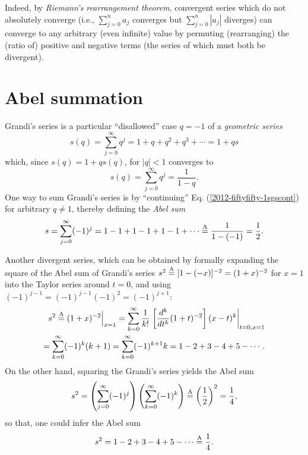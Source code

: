 Indeed, by {\em Riemann's rearrangement theorem},
convergent series  which do not absolutely converge
(i.e., $\sum_{j=0}^n a_j$ converges but $\sum_{j=0}^n \left| a_j \right|$ diverges)
can converge to any arbitrary (even infinite) value
by permuting (rearranging) the (ratio of) positive and negative terms
(the series of which must both be divergent).



\section{Abel summation}

Grandi's series is a particular ``disallowed'' case $q=-1$ of a {\em geometric series}
\begin{equation}
s(q) = \sum_{j=0}^\infty q^j=1+q+q^2+q^3+ \cdots  =1+q s
\label{2009-fiftyfifty-1sgs}
\end{equation}
which, since $s(q)=1+q s(q)$, for $\vert q\vert <1$ converges  to
\begin{equation}
s(q)= \sum_{j=0}^\infty q^j= \frac{1}{1-q}.
\label{2012-fiftyfifty-1sgscont}
\end{equation}
One way to sum Grandi's series is by ``continuing''
Eq. (\ref{2012-fiftyfifty-1sgscont})
for arbitrary $q\neq 1$, thereby defining the
{\em Abel sum}
\begin{equation}
s=\sum_{j=0}^\infty(-1)^j  = 1-1+1-1+1-1+\cdots \stackrel{{\rm A}}{=} \frac{1}{1-(-1)} = \frac{1}{2}.
\label{2012-fiftyfifty-1sgscont1}
\end{equation}


Another divergent series,
which can be obtained by formally  expanding  the square of the Abel sum of
Grandi's series
$
s^2 \stackrel{{\rm A}}{=} [1-(-x)]^{-2} = (1+x)^{-2}
$ for  $x=1$
into the Taylor series\cite{Kline-83}
around $t=0$, and using   $(-1)^{j-1}=(-1)^{j-1}(-1)^{2}=(-1)^{j+1}$:
\begin{equation}
\begin{split}
s^2   \stackrel{{\rm A}}{=} (1+x)^{-2}  \Big|_{x =1}=
\sum_{k=0}^\infty \frac{1}{k!}\left.\left[\frac{d^k}{d{t}^k}  (1+t)^{-2}\right]   (x-t)^k\right|_{t=0, x=1}
\\
=
\sum_{k=0}^\infty (-1)^k (k+1) =
\sum_{k=0}^\infty (-1)^{k+1} k =
1-2+3-4+5-\cdots
.
\label{2009-fiftyfifty-1s1}
\end{split}
\end{equation}
On the other hand, squaring the Grandi's series yields the Abel sum
\begin{equation}
s^2 =
\left(\sum_{j=0}^\infty (-1)^j\right)
\left(\sum_{k=0}^\infty (-1)^k\right)
\stackrel{{\rm A}}{=} \left(\frac{1}{2}\right)^2=\frac{1}{4},
\end{equation}
so that, one could infer the Abel sum
\begin{equation}
s^2 =
1-2+3-4+5-\cdots  \stackrel{{\rm A}}{=} \frac{1}{4}.
\end{equation}


